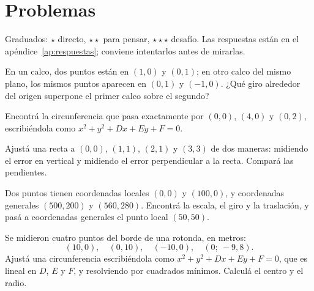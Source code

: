 \section{Problemas}\label{sec:problemas-12}

Graduados: \({\star}\) directo, \({\star}{\star}\) para pensar, \({\star}{\star}{\star}\) desafío. Las respuestas están en el apéndice~\ref{ap:respuestas}; conviene intentarlos antes de mirarlas.

\begin{problema}[\({\star}\)]\label{pb:12-1}
En un calco, dos puntos están en \((1,0)\) y \((0,1)\); en otro calco del mismo plano, los mismos puntos aparecen en \((0,1)\) y \((-1,0)\). ¿Qué giro alrededor del origen superpone el primer calco sobre el segundo?
\end{problema}

\begin{problema}[\({\star}\)]\label{pb:12-2}
Encontrá la circunferencia que pasa exactamente por \((0,0)\), \((4,0)\) y \((0,2)\), escribiéndola como \(x^2+y^2+Dx+Ey+F=0\).
\end{problema}

\begin{problema}[\({\star}{\star}\)]\label{pb:12-3}
Ajustá una recta a \((0,0)\), \((1,1)\), \((2,1)\) y \((3,3)\) de dos maneras: midiendo el error en vertical y midiendo el error perpendicular a la recta. Compará las pendientes.
\end{problema}

\begin{problema}[\({\star}{\star}\)]\label{pb:12-4}
Dos puntos tienen coordenadas locales \((0,0)\) y \((100,0)\), y coordenadas generales \((500,200)\) y \((560,280)\). Encontrá la escala, el giro y la traslación, y pasá a coordenadas generales el punto local \((50,50)\).
\end{problema}

\begin{problema}[\({\star}{\star}{\star}\)]\label{pb:12-5}
Se midieron cuatro puntos del borde de una rotonda, en metros: \[(10,0),\quad(0,10),\quad(-10,0),\quad(0;\ -9{,}8).\] Ajustá una circunferencia escribiéndola como \(x^2+y^2+Dx+Ey+F=0\), que es lineal en \(D\), \(E\) y \(F\), y resolviendo por cuadrados mínimos. Calculá el centro y el radio.
\end{problema}
